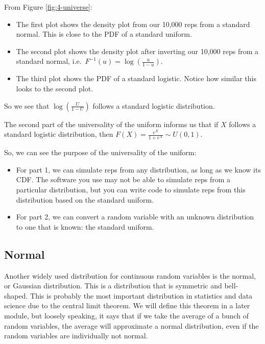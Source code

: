 \documentclass[
]{book}
\providecommand{\tightlist}{%
  \setlength{\itemsep}{0pt}\setlength{\parskip}{0pt}}
\begin{document}
From Figure \ref{fig:4-universe}:

\begin{itemize}
\tightlist
\item
  The first plot shows the density plot from our 10,000 reps from a standard normal. This is close to the PDF of a standard uniform.
\item
  The second plot shows the density plot after inverting our 10,000 reps from a standard normal, i.e.~\(F^{-1}(u) = \log (\frac{u}{1-u})\).
\item
  The third plot shows the PDF of a standard logistic. Notice how similar this looks to the second plot.
\end{itemize}

So we see that \(\log (\frac{U}{1-U})\) follows a standard logistic distribution.

The second part of the universality of the uniform informs us that if \(X\) follows a standard logistic distribution, then \(F(X) = \frac{e^X}{1 + e^X} \sim U(0,1)\).

So, we can see the purpose of the universality of the uniform:

\begin{itemize}
\tightlist
\item
  For part 1, we can simulate reps from any distribution, as long as we know its CDF. The software you use may not be able to simulate reps from a particular distribution, but you can write code to simulate reps from this distribution based on the standard uniform.
\item
  For part 2, we can convert a random variable with an unknown distribution to one that is known: the standard uniform.
\end{itemize}

\subsection{Normal}\label{normal}

Another widely used distribution for continuous random variables is the normal, or Gaussian distribution. This is a distribution that is symmetric and bell-shaped. This is probably the most important distribution in statistics and data science due to the central limit theorem. We will define this theorem in a later module, but loosely speaking, it says that if we take the average of a bunch of random variables, the average will approximate a normal distribution, even if the random variables are individually not normal.
\end{document}
